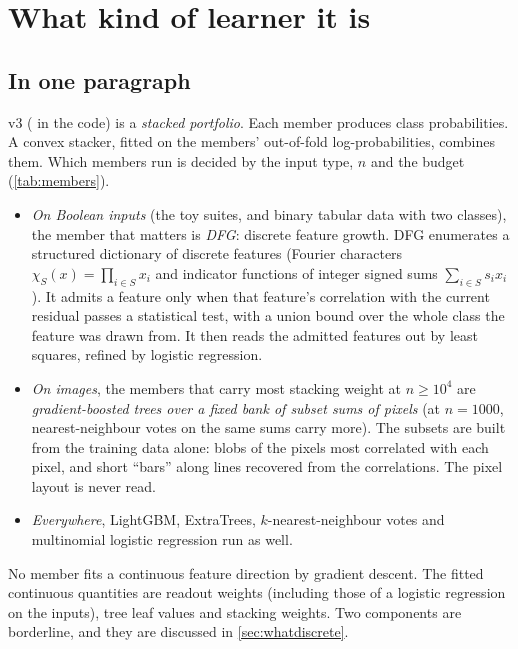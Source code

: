 \section{What kind of learner it is}\label{sec:learner}

\subsection{In one paragraph}

v3 ( in the code) is a \emph{stacked portfolio}. Each member produces class probabilities. A convex stacker, fitted on the members' out-of-fold log-probabilities, combines them. Which members run is decided by the input type, $n$ and the budget (\cref{tab:members}).
\begin{itemize}
\item \emph{On Boolean inputs} (the toy suites, and binary tabular data with two classes), the member that matters is \emph{DFG}: discrete feature growth. DFG enumerates a structured dictionary of discrete features (Fourier characters $\chi_S(x)=\prod_{i\in S}x_i$ and indicator functions of integer signed sums $\sum_{i\in S}s_ix_i$). It admits a feature only when that feature's correlation with the current residual passes a statistical test, with a union bound over the whole class the feature was drawn from. It then reads the admitted features out by least squares, refined by logistic regression.
\item \emph{On images}, the members that carry most stacking weight at $n\ge10^4$ are \emph{gradient-boosted trees over a fixed bank of subset sums of pixels} (at $n=1000$, nearest-neighbour votes on the same sums carry more). The subsets are built from the training data alone: blobs of the pixels most correlated with each pixel, and short ``bars'' along lines recovered from the correlations. The pixel layout is never read.
\item \emph{Everywhere}, LightGBM, ExtraTrees, $k$-nearest-neighbour votes and multinomial logistic regression run as well.
\end{itemize}
No member fits a continuous feature direction by gradient descent. The fitted continuous quantities are readout weights (including those of a logistic regression on the inputs), tree leaf values and stacking weights. Two components are borderline, and they are discussed in \cref{sec:whatdiscrete}.


